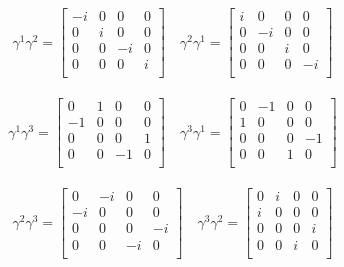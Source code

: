 \begin{align*}
\gamma^1 \gamma^2 = \begin{bmatrix}
 -i  &  0  &  0  &  0  \\
 0  &  i  &  0  &  0  \\
 0  &  0  &  -i  &  0  \\
 0  &  0  &  0  &  i  \\
\end{bmatrix} \quad
\gamma^2 \gamma^1 = \begin{bmatrix}
 i  &  0  &  0  &  0  \\
 0  &  -i  &  0  &  0  \\
 0  &  0  &  i  &  0  \\
 0  &  0  &  0  &  -i  \\
\end{bmatrix}
\end{align*}

\begin{align*}
\gamma^1 \gamma^3 = \begin{bmatrix}
 0  &  1  &  0  &  0  \\
 -1  &  0  &  0  &  0  \\
 0  &  0  &  0  &  1  \\
 0  &  0  &  -1  &  0  \\
\end{bmatrix} \quad
\gamma^3 \gamma^1 = \begin{bmatrix}
 0  &  -1  &  0  &  0  \\
 1  &  0  &  0  &  0  \\
 0  &  0  &  0  &  -1  \\
 0  &  0  &  1  &  0  \\
\end{bmatrix}
\end{align*}

\begin{align*}
\gamma^2 \gamma^3 = \begin{bmatrix}
 0  &  -i  &  0  &  0  \\
 -i  &  0  &  0  &  0  \\
 0  &  0  &  0  &  -i  \\
 0  &  0  &  -i  &  0  \\
\end{bmatrix} \quad
\gamma^3 \gamma^2 = \begin{bmatrix}
 0  &  i  &  0  &  0  \\
 i  &  0  &  0  &  0  \\
 0  &  0  &  0  &  i  \\
 0  &  0  &  i  &  0  \\
\end{bmatrix}
\end{align*}

